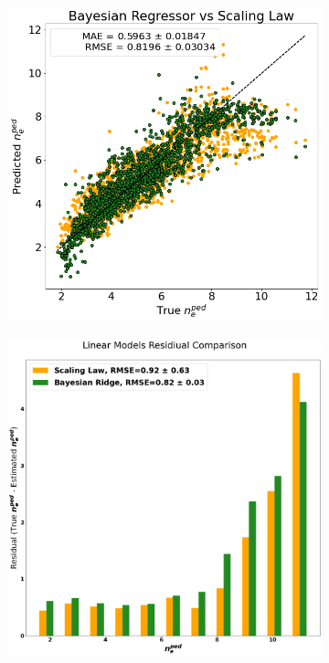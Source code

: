 \documentclass[a4paper, twoside, final, 12pt]{article}
\begin{document}
{\begin{figure}[H]
	\centering
	\begin{subfigure}{0.495\linewidth}
		\centering
		\includegraphics[scale=0.35]{./src/Baysian_regression_predictions}
	\end{subfigure}
	\begin{subfigure}{0.495\linewidth}
		\centering
		\includegraphics[scale=0.18]{./src/linear_comp}

\end{subfigure}
\end{figure}}
\end{document}
